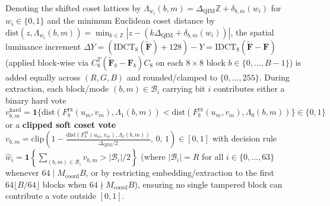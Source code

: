 \documentclass[conference,10pt]{IEEEtran}
\begin{document}
Denoting the shifted coset lattices by $\Lambda_{w_i}(b,m) = \Delta_{\text{QIM}}\mathbb{Z} + \delta_{b,m}(w_i)$ for $w_i \in \{0,1\}$ and the minimum Euclidean coset distance by $\mathrm{dist}(z, \Lambda_{w_i}(b,m)) = \min_{k \in \mathbb{Z}} |z - (k\Delta_{\text{QIM}} + \delta_{b,m}(w_i))|$, the spatial luminance increment $\Delta Y = (\mathrm{IDCT}_8(\widetilde{\mathbf{F}}) + 128) - Y = \mathrm{IDCT}_8(\widetilde{\mathbf{F}} - \mathbf{F})$ (applied block-wise via $C_8^T (\widetilde{\mathbf{F}}_b - \mathbf{F}_b) C_8$ on each $8\times 8$ block $b \in \{0, \dots, B-1\}$) is added equally across $(R, G, B)$ and rounded/clamped to $\{0, \dots, 255\}$. During extraction, each block/mode $(b,m) \in \mathcal{B}_i$ carrying bit $i$ contributes either a binary hard vote $v_{b,m}^{\text{hard}} = \mathbf{1}\{\mathrm{dist}(F^{\text{rx}}_b(u_m,v_m), \Lambda_1(b,m)) < \mathrm{dist}(F^{\text{rx}}_b(u_m,v_m), \Lambda_0(b,m))\} \in \{0, 1\}$ or a \textbf{clipped soft coset vote} $v_{b,m} = \mathrm{clip}\!\left(1 - \frac{\mathrm{dist}(F^{\text{rx}}_b(u_m,v_m), \Lambda_1(b,m))}{\Delta_{\text{QIM}}/2},\, 0,\, 1\right) \in [0, 1]$ with decision rule $\hat{w}_i = \mathbf{1}\!\left\{\sum_{(b,m)\in\mathcal{B}_i} v_{b,m} > |\mathcal{B}_i|/2\right\}$ (where $|\mathcal{B}_i| = R$ for all $i \in \{0,\dots,63\}$ whenever $64 \mid M_{\text{coord}} B$, or by restricting embedding/extraction to the first $64\lfloor B/64\rfloor$ blocks when $64 \nmid M_{\text{coord}} B$), ensuring no single tampered block can contribute a vote outside $[0, 1]$.
\end{document}
